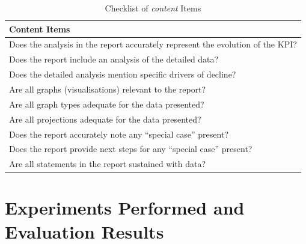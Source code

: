\documentclass[a4paper]{report}
\begin{document}
\begin{table}[H]
\centering
\begin{tabular}{|p{14cm}|}
    \hline
    \textbf{Content Items} \\ \hline
    Does the analysis in the report accurately represent the evolution of the KPI? \\ \hline
    Does the report include an analysis of the detailed data? \\ \hline
    Does the detailed analysis mention specific drivers of decline? \\ \hline
    Are all graphs (visualisations) relevant to the report? \\ \hline
    Are all graph types adequate for the data presented? \\ \hline
    Are all projections adequate for the data presented? \\ \hline
    Does the report accurately note any ``special case'' present? \\ \hline
    Does the report provide next steps for any ``special case'' present? \\ \hline
Are all statements in the report sustained with data? \\ \hline
\end{tabular}
\caption{Checklist of \textit{content} Items}
\end{table}

\chapter{Experiments Performed and Evaluation Results}
\label{annex:experiments}
\end{document}
